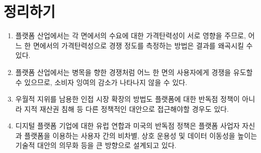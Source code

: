 \section*{정리하기}
\begin{enumerate}
\item 플랫폼 산업에서는 각 면에서의 수요에 대한 가격탄력성이 서로 영향을 주므로, 어느 한 면에서의 가격탄력성으로 경쟁 정도를 측정하는 방법은 결과를 왜곡시킬 수 있다.
\item 플랫폼 산업에서는 병목을 향한 경쟁처럼 어느 한 면의 사용자에게 경쟁을 유도할 수 있으므로, 소비자 잉여의 감소가 나타나지 않을 수 있다.
\item 우월적 지위를 남용한 인접 시장 확장의 방법도 플랫폼에 대한 반독점 정책이 아니라 지적 재산권 침해 등 다른 정책적인 대안으로 접근해야할 경우도 있다.
\item 디지털 플랫폼 기업에 대한 유럽 연합과 미국의 반독점 정책은 플랫폼 사업자 자신과 플랫폼을 이용하는 사용자 간의 비차별, 상호 운용성 및 데이터 이동성을 높이는 기술적 대안의 의무화 등을 큰 방향으로 설계되고 있다.
\end{enumerate}